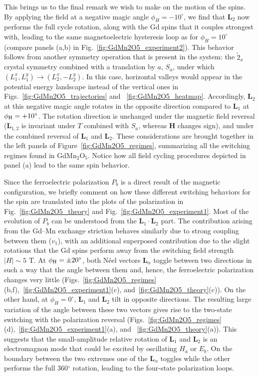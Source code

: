 This brings us to the final remark we wish to make on the motion of the spins.
By applying the field at a negative magic angle $\phi_H = -10^\circ$, we find that $\bm L_2$ now performs the full cycle rotation, along with the Gd spins that it couples strongest with, leading to the same magnetoelectric hysteresis loop as for $\phi_H = 10^\circ$ (compare panels (a,b) in Fig.~\ref{fig:GdMn2O5_experiment2}).
This behavior follows from another symmetry operation that is present in the system: the $\tilde{2}_x$ crystal symmetry combined with a translation by $a$, $S_a$, under which $(L_1^x,L_1^y) \rightarrow (L_2^x,-L_2^y)$.
In this case, horizontal valleys would appear in the potential energy landscape instead of the vertical ones in Figs.~\ref{fig:GdMn2O5_trajectories} and ~\ref{fig:GdMn2O5_heatmap}.
Accordingly, $\bm{L}_2$ at this negative magic angle rotates in the opposite direction compared to  $\bm{L}_1$ at $\phi_{\rm H} = +10^\circ$.
The rotation direction is unchanged under the magnetic field reversal ($\bm{L}_{1,2}$ is invariant under $T$ combined with $S_a$, whereas $\bm{H}$ changes sign), and under the combined reversal of $\bm{L}_{1}$ and $\bm{L}_{2}$.
These considerations are brought together in the left panels of Figure~\ref{fig:GdMn2O5_regimes}, summarizing all the switching regimes found in GdMn$_2$O$_5$.
Notice how all field cycling procedures depicted in panel (a) lead to the same spin behavior.

%
Since the ferroelectric polarization $P_b$ is a direct result of the magnetic configuration, we briefly comment on how these different switching behaviors for the spin are translated into the plots of the polarization in Fig.~\ref{fig:GdMn2O5_theory} and Fig.~\ref{fig:GdMn2O5_experiment1}.
Most of the evolution of $P_b$ can be understood from the $\bm L_1 \cdot \bm L_2$ part. The contribution arising from the Gd--Mn exchange striction behaves similarly due to strong coupling between them ($v_1$), with an additional superposed contribution due to the slight rotations that the Gd spins perform away from the switching field strength $|H| \sim 5$ T.
At $\phi_{\rm H} = \pm 20^\circ$, both N\'eel vectors $\bm L_\alpha$ toggle between two directions in such a way that the angle between them and, hence, the ferroelectric polarization changes very little (Figs.~\ref{fig:GdMn2O5_regimes}(b,f),~\ref{fig:GdMn2O5_experiment1}(c), and~\ref{fig:GdMn2O5_theory}(c)). 
On the other hand, at $\phi_{H}=0^\circ$, $\bm{L}_1$ and  $\bm{L}_2$ tilt in opposite directions. The resulting large variation of the angle between these two vectors gives rise to the two-state switching with the polarization reversal (Figs.~\ref{fig:GdMn2O5_regimes}(d),~\ref{fig:GdMn2O5_experiment1}(a), and ~\ref{fig:GdMn2O5_theory}(a)). This suggests that the small-amplitude relative rotation of $\bm{L}_1$ and $\bm{L}_2$ is an electromagnon mode that could be excited by oscillating $H_a$ or $E_b$.
On the boundary between the two extremes one of the $\bm L_\alpha$ toggles while the other performs the full 360$^\circ$ rotation, leading to the four-state polarization loops.
